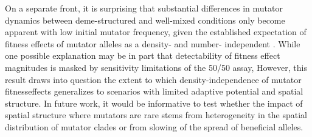 On a separate front, it is surprising that substantial differences in mutator dynamics between deme-structured and well-mixed conditions only become apparent with low initial mutator frequency, given the established expectation of fitness effects of mutator alleles as a density- and number- independent \citep{raynes2019selection}.
While one possible explanation may be in part that detectability of fitness effect magnitudes is masked by sensitivity limitations of the 50/50 assay, However, this result draws into question the extent to which density-independence of mutator fitnesseffects generalizes to scenarios with limited adaptive potential and spatial structure.
In future work, it would be informative to test whether the impact of spatial structure where mutators are rare stems from heterogeneity in the spatial distribution of mutator clades or from slowing of the spread of beneficial alleles.
